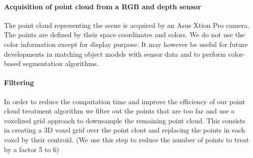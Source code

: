\paragraph{Acquisition of point cloud from a RGB and depth sensor}

The point cloud representing the scene is acquired by an Asus Xtion Pro camera.
The points are defined by their space coordinates and colors.
We do not use the color information except for display purpose.
It may however be useful for future developments in matching object models with sensor data and to perform color-based segmentation algorithms.

\paragraph{Filtering}

In order to reduce the computation time and improve the efficiency of our point cloud treatment algorithm we filter out the points that are too far and use a voxelized grid approach to downsample the remaining point cloud.
This consists in creating a 3D voxel grid over the point clout and replacing the points in each voxel by their centroid.
(We use this step to reduce the number of points to treat by a factor 5 to 6)



